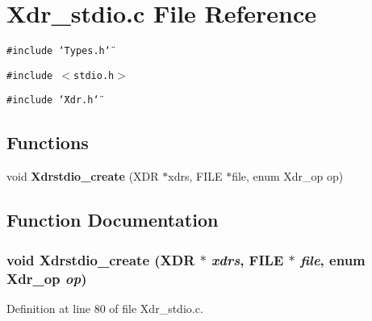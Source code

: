\section{Xdr\_\-stdio.c File Reference}
\label{Xdr__stdio_8c}
{\tt \#include \char`\"{}Types.h\char`\"{}}\par
{\tt \#include $<$stdio.h$>$}\par
{\tt \#include \char`\"{}Xdr.h\char`\"{}}\par
\subsection*{Functions}
\begin{CompactItemize}
\item 
void {\bf Xdrstdio\_\-create} (XDR $\ast$xdrs, FILE $\ast$file, enum Xdr\_\-op op)
\end{CompactItemize}


\subsection{Function Documentation}
\subsubsection{\setlength{\rightskip}{0pt plus 5cm}void Xdrstdio\_\-create (XDR $\ast$ {\em xdrs}, FILE $\ast$ {\em file}, enum Xdr\_\-op {\em op})}\label{Xdr__stdio_8c_a9}




Definition at line 80 of file Xdr\_\-stdio.c.